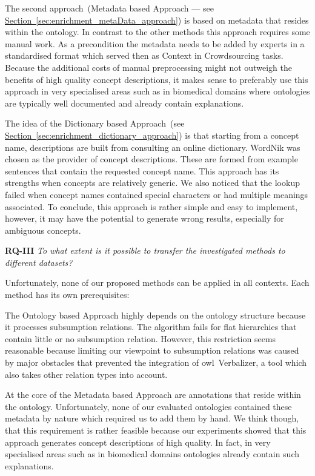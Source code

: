 The second approach~(Metadata based Approach --- see \hyperref[sec:enrichment_metaData_approach]{Section~\ref*{sec:enrichment_metaData_approach}})
is based on metadata that resides within the ontology. In contrast to the other methods this approach requires some manual work. As a precondition 
the metadata needs to be added by experts in a standardised format which served then as Context in Crowdsourcing tasks. Because the additional costs of manual preprocessing might not outweigh the benefits of high quality concept descriptions, it makes sense to preferably use this approach in very specialised areas such as in biomedical domains where ontologies are typically well documented and already contain explanations.

The idea of the Dictionary based Approach~(see \hyperref[sec:enrichment_dictionary_approach]{Section~\ref*{sec:enrichment_dictionary_approach}})
is that starting from a concept name, descriptions are built from consulting an online dictionary. WordNik was chosen as the provider of concept descriptions. These are formed from example sentences that contain the requested concept name. This approach has its strengths when concepts are relatively generic. We also noticed that the lookup failed when concept names contained special characters or had multiple meanings associated. 
To conclude, this approach is rather simple and easy to implement, however, it may have the potential to generate wrong results, especially for ambiguous concepts. 


\textbf{RQ-III} \emph{To what extent is it possible to transfer the investigated methods to different datasets?}

Unfortunately, none of our proposed methods can be applied in all contexts. Each method has its own prerequisites:

The Ontology based Approach highly depends on the ontology structure because it processes subsumption relations. The algorithm fails for flat hierarchies that contain little or no subsumption relation. However, this restriction seems reasonable because limiting our viewpoint to subsumption relations was caused by major obstacles that prevented the integration of \gls{owl}~Verbalizer, a tool which also takes other relation types into account. 

At the core of the Metadata based Approach are annotations that reside within the ontology. Unfortunately, none of our evaluated ontologies contained these metadata by nature which required us to add them by hand. We think though, that this requirement is rather feasible because our experiments showed that this approach generates concept descriptions of high quality.  In fact, in very specialised areas such as in biomedical domains ontologies already contain such explanations. 

